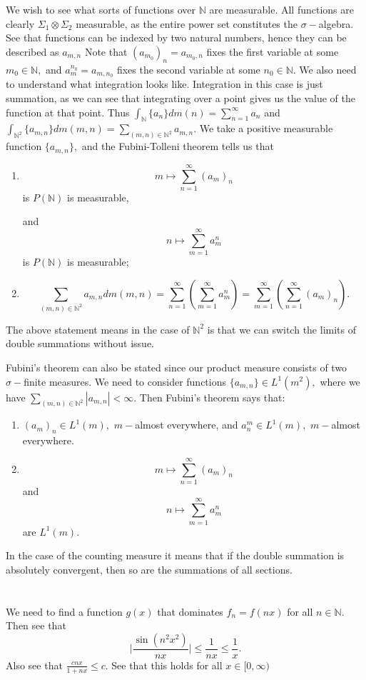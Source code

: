 \documentclass{article}
\begin{document}
We wish to see what sorts of functions over $\mathbb{N}$ are measurable. All functions are clearly $\Sigma_1 \otimes \Sigma_2$ measurable, as the entire power set constitutes the $\sigma-$algebra. See that functions can be indexed by two natural numbers, hence they can be described as $a_{m,n}$ Note that $(a_{m_0})_{n}=a_{m_0,n}$ fixes the first variable at some $m_0 \in \mathbb{N},$ and $a^{n_0}_m=a_{m,n_0}$ fixes the second variable at some $n_0 \in \mathbb{N}.$  
We also need to understand what integration looks like. Integration in this case is just summation, as we can see that integrating over a point gives us the value of the function at that point. Thus $\int_{\mathbb{N}}\{a_n\} dm(n)=\sum_{n=1}^{\infty}a_n $ and $ \int_{\mathbb{N}^2}\{a_{m,n}\} dm(m,n)=\sum_{(m,n) \in \mathbb{N}^2} a_{m,n}.$
We take a positive measurable function $\{a_{m,n}\},$ and the Fubini-Tolleni theorem tells us that 
\begin{enumerate}
	\item $$m \mapsto \sum_{n=1}^{\infty} (a_m)_{n} $$ is $P(\mathbb{N})$ is measurable, 
	
	and $$n \mapsto \sum_{m=1}^{\infty}a^{n}_m $$ is $P(\mathbb{N})$ is measurable;
	\item $$\sum_{(m,n) \in \mathbb{N}^2}a_{m,n}dm(m,n) = \sum_{n=1}^{\infty} \left( \sum_{m=1}^{\infty}a^{n}_m \right)= \sum_{m=1}^{\infty} \left( \sum_{n=1}^{\infty}(a_m)_{n} \right).$$
\end{enumerate}

The above statement means in the case of $\mathbb{N}^2$ is that we can switch the limits of double summations without issue. 

Fubini's theorem can also be stated since our product measure consists of two $\sigma-$finite measures. We need to consider functions $\{a_{m,n}\} \in L^1(m^2),$ where we have $\sum_{(m,n) \in \mathbb{N}^2} |a_{m,n}|< \infty.$ Then Fubini's theorem says that: 
\begin{enumerate}
	\item $(a_m)_n \in L^1(m),$ $m-$almost everywhere, and $a^m_n \in L^1(m),$ $m-$almost everywhere.
	\item $$m \mapsto \sum_{n=1}^{\infty} (a_m)_{n}$$ and $$ n \mapsto \sum_{m=1}^{\infty}a^{n}_m$$ are $L^1(m)$.  
\end{enumerate}
In the case of the counting measure it means that if the double summation is absolutely convergent, then so are the summations of all sections.

 
\section{} %
We need to find a function $g(x)$ that dominates $f_n=f(nx)$ for all $n \in \mathbb{N}.$ Then see that $$\mid \frac{\sin(n^2x^2)}{nx}\mid \leq \frac{1}{nx} \leq \frac{1}{x}.$$ Also see that $\frac{cnx}{1+nx}\leq c.$ See that this holds for all $x \in [0,\infty)$
\end{document}
